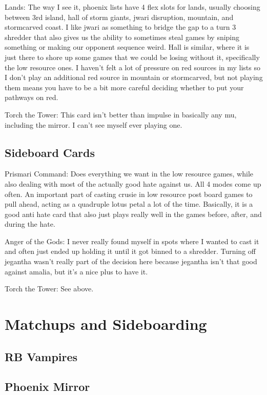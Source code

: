 \documentclass[12pt]{article}
\begin{document}
Lands:
The way I see it, phoenix lists have 4 flex slots for lands, usually choosing between 3rd island, hall of storm giants, jwari disruption, mountain, and stormcarved coast. I like jwari as something to bridge the gap to a turn 3 shredder that also gives us the ability to sometimes steal games by sniping something or making our opponent sequence weird. Hall is similar, where it is just there to shore up some games that we could be losing without it, specifically the low resource ones. I haven't felt a lot of pressure on red sources in my lists so I don't play an additional red source in mountain or stormcarved, but not playing them means you have to be a bit more careful deciding whether to put your pathways on red.

Torch the Tower:
This card isn't better than impulse in basically any mu, including the mirror. I can't see myself ever playing one.

\subsection{Sideboard Cards}
\label{sec:sbchoices}
Prismari Command:
Does everything we want in the low resource games, while also dealing with most of the actually good hate against us. All 4 modes come up often. An important part of casting crusie in low resource post board games to pull ahead, acting as a quadruple lotus petal a lot of the time. Basically, it is a good anti hate card that also just plays really well in the games before, after, and during the hate.

Anger of the Gods:
I never really found myself in spots where I wanted to cast it and often just ended up holding it until it got binned to a shredder. Turning off jegantha wasn't really part of the decision here because jegantha isn't that good against amalia, but it's a nice plus to have it.

Torch the Tower:
See above.


\clearpage
\section{Matchups and Sideboarding}
\subsection{RB Vampires}

\subsection{Phoenix Mirror}
\end{document}

